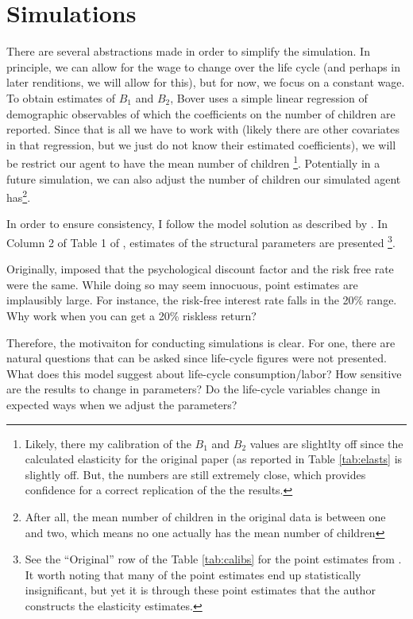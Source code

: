 \documentclass[ProjectMMD]{subfiles}
\begin{document}
\section{Simulations}
There are several abstractions made in order to simplify the simulation. In principle, we can allow for the wage to change over the life cycle (and perhaps in later renditions, we will allow for this), but for now, we focus on a constant wage. To obtain estimates of $B_1$ and $B_2$, Bover uses a simple linear regression of demographic observables of which the coefficients on the number of children are reported. Since that is all we have to work with (likely there are other covariates in that regression, but we just do not know their estimated coefficients), we will be restrict our agent to have the mean number of children \footnote{Likely, there my calibration of the $B_1$ and $B_2$ values are slightlty off since the calculated elasticity for the original paper (as reported in Table \ref{tab:elasts} is slightly off. But, the numbers are still extremely close, which provides confidence for a correct replication of the the \cite{bover1991relaxing} results.}. Potentially in a future simulation, we can also adjust the number of children our simulated agent has\footnote{After all, the mean number of children in the original data is between one and two, which means no one actually has the mean number of children}.   

In order to ensure consistency, I follow the model solution as described by \cite{bover1991relaxing}. In Column 2 of Table 1 of \cite{bover1991relaxing}, estimates of the structural parameters are presented \footnote{See the ``Original'' row of the Table \ref{tab:calibs} for the point estimates from \cite{bover1991relaxing}. It worth noting that many of the point estimates end up statistically insignificant, but yet it is through these point estimates that the author constructs the elasticity estimates. }.

Originally, \cite{bover1991relaxing} imposed that the psychological discount factor and the risk free rate were the same. While doing so may seem innocuous, point estimates are implausibly large. For instance, the risk-free interest rate falls in the 20\% range. Why work when you can get a 20\% riskless return?

Therefore, the motivaiton for conducting simulations is clear. For one, there are natural questions that can be asked since life-cycle figures were not presented. What does this model suggest about life-cycle consumption/labor? How sensitive are the results to change in parameters? Do the life-cycle variables change in expected ways when we adjust the parameters?
\end{document}
